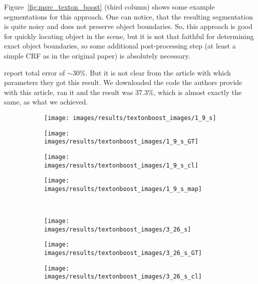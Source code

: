 Figure~\ref{fig:msrc_texton_boost} (third column) shows some example segmentations for this approach. One can notice, that the resulting segmentation
is quite noisy and does not preserve object boundaries. So, this approach is good for quickly locating object in the scene, but it is not that faithful
for determining exact object boundaries, so some additional post-processing step (at least a simple CRF as in the original paper) is absolutely
necessary.

\cite{Shotton2009} report total error of $\sim$30\%. But it is not clear from the article with which parameters they got this result. We downloaded the code
the authors provide with this article, ran it and the result was 37.3\%, which is almost exactly the same, as what we achieved.

\begin{figure}[t]
 \centering
 \begin{subfigure}[c]{0.24\textwidth}
  \centering
  \texttt{[image: images/results/textonboost\_images/1\_9\_s]}
 \end{subfigure}
 \begin{subfigure}[c]{0.24\textwidth}
  \centering
  \texttt{[image: images/results/textonboost\_images/1\_9\_s\_GT]}
 \end{subfigure}
 \begin{subfigure}[c]{0.24\textwidth}
  \centering
  \texttt{[image: images/results/textonboost\_images/1\_9\_s\_cl]}
 \end{subfigure}
 \begin{subfigure}[c]{0.24\textwidth}
  \centering
  \texttt{[image: images/results/textonboost\_images/1\_9\_s\_map]}
 \end{subfigure}
 \\
 \begin{subfigure}[c]{0.24\textwidth}
  \centering
  \texttt{[image: images/results/textonboost\_images/3\_26\_s]}
 \end{subfigure}
 \begin{subfigure}[c]{0.24\textwidth}
  \centering
  \texttt{[image: images/results/textonboost\_images/3\_26\_s\_GT]}
 \end{subfigure}
 \begin{subfigure}[c]{0.24\textwidth}
  \centering
  \texttt{[image: images/results/textonboost\_images/3\_26\_s\_cl]}
 \end{subfigure}
 \begin{subfigure}[c]{0.24\textwidth}

\end{subfigure}
\end{figure}
